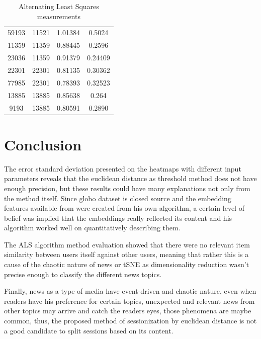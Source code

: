 \documentclass[ecp,tc,english]{iiufrgs}
\begin{document}
\begin{table}[H]
\begin{tabular}{ |c|c|c|c| }
                59193 & 11521 & 1.01384 & 0.5024 \\
                11359 & 11359 & 0.88445 & 0.2596 \\
                23036 & 11359 & 0.91379 & 0.24409 \\
                \rowcolor[RGB]{220,220,220}                
                22301 & 22301 & 0.81135 & 0.30362 \\
                \rowcolor[RGB]{220,220,220}                
                77985 & 22301 & 0.78393 & 0.32523 \\
                13885 & 13885 & 0.85638 & 0.264 \\
                9193 & 13885 & 0.80591 & 0.2890 \\
                \hline
            \end{tabular}
            \caption{Alternating Least Squares measurements}
            \label{tab:alternate_least_squares_metrics}
        \end{table}


\chapter{Conclusion}
The error standard deviation presented on the heatmaps with different input parameters reveals that the euclidean distance as threshold method does not have enough precision, but these results could have many explanations not only from the method itself. Since globo dataset is closed source and the embedding features available from \cite{moreira2018chameleon} were created from his own algorithm, a certain level of belief was implied that the embeddings really reflected its content and his algorithm worked well on quantitatively describing them.

The ALS algorithm method evaluation showed that there were no relevant item similarity between users itself against other users, meaning that rather this is a cause of the chaotic nature of news or tSNE as dimensionality reduction wasn't precise enough to classify the different news topics.

Finally, news as a type of media have event-driven and chaotic nature, even when readers have his preference for certain topics, unexpected and relevant news from other topics may arrive and catch the readers eyes, those phenomena are maybe common, thus, the proposed method of sessionization by euclidean distance is not a good candidate to split sessions based on its content.




\end{document}
